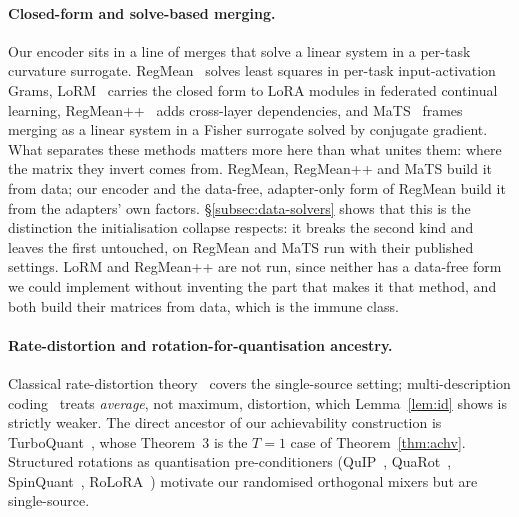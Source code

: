 \paragraph{Closed-form and solve-based merging.} Our encoder sits in a line
of merges that solve a linear system in a per-task curvature surrogate.
RegMean~\citep{jin2023regmean} solves least squares in per-task
input-activation Grams, LoRM~\citep{lorm2024} carries the closed form to LoRA
modules in federated continual learning, RegMean++~\citep{regmeanpp2025} adds
cross-layer dependencies, and MaTS~\citep{tam2024mats} frames merging as a
linear system in a Fisher surrogate solved by conjugate gradient. What
separates these methods matters more here than what unites them: where the
matrix they invert comes from. RegMean, RegMean++ and MaTS build it from data;
our encoder and the data-free, adapter-only form of RegMean build it from the
adapters' own factors. \S\ref{subsec:data-solvers} shows that this is the
distinction the initialisation collapse respects: it breaks the second kind and
leaves the first untouched, on RegMean and MaTS run with their published
settings. LoRM and RegMean++ are not run, since neither has a data-free form we
could implement without inventing the part that makes it that method, and both
build their matrices from data, which is the immune class.

\paragraph{Rate-distortion and rotation-for-quantisation ancestry.}
Classical rate-distortion theory~\citep{shannon1959rd,coverthomas}
covers the single-source setting; multi-description
coding~\citep{elgamalcover1982md} treats \emph{average}, not maximum,
distortion, which Lemma~\ref{lem:id} shows is strictly weaker. The
direct ancestor of our achievability construction is
TurboQuant~\citep{zandieh2025turboquant}, whose Theorem~3 is the $T = 1$
case of Theorem~\ref{thm:achv}. Structured rotations as
quantisation pre-conditioners (QuIP~\citep{tseng2024quip},
QuaRot~\citep{ashkboos2024quarot}, SpinQuant~\citep{liu2025spinquant},
RoLoRA~\citep{xi2024rolora}) motivate our randomised orthogonal mixers
but are single-source.

